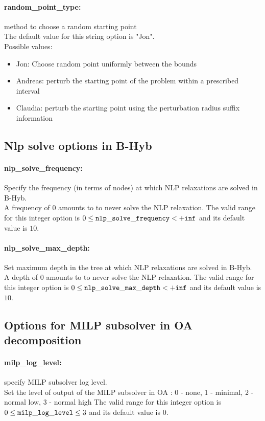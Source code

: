 \paragraph{random\_point\_type:} method to choose a random starting point $\;$ \\

The default value for this string option is "Jon".
\\ 
Possible values:
\begin{itemize}
   \item Jon: Choose random point uniformly between the bounds
   \item Andreas: perturb the starting point of the problem
within a prescribed interval
   \item Claudia: perturb the starting point using the
perturbation radius suffix information
\end{itemize}

\subsection{Nlp solve options in B-Hyb}
\label{sec:Nlp_solve_options_in_B-Hyb}
\paragraph{nlp\_solve\_frequency:} Specify the frequency (in terms of nodes) at which NLP relaxations are solved in B-Hyb. $\;$ \\
 A frequency of 0 amounts to to never solve the
NLP relaxation. The valid range for this integer option is
$0 \le {\tt nlp\_solve\_frequency } <  {\tt +inf}$
and its default value is $10$.


\paragraph{nlp\_solve\_max\_depth:} Set maximum depth in the tree at which NLP relaxations are solved in B-Hyb. $\;$ \\
 A depth of 0 amounts to to never solve the NLP
relaxation. The valid range for this integer option is
$0 \le {\tt nlp\_solve\_max\_depth } <  {\tt +inf}$
and its default value is $10$.


\subsection{Options for MILP subsolver in OA decomposition}
\label{sec:Options_for_MILP_subsolver_in_OA_decomposition}
\paragraph{milp\_log\_level:} specify MILP subsolver log level. $\;$ \\
 Set the level of output of the MILP subsolver in
OA : 0 - none, 1 - minimal, 2 - normal low, 3 -
normal high The valid range for this integer option is
$0 \le {\tt milp\_log\_level } \le 3$
and its default value is $0$.



